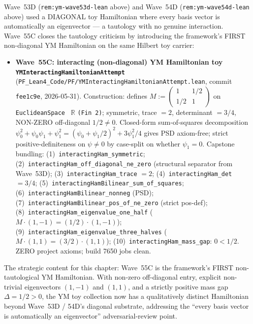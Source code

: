 \begin{remark}\label{rem:ym-wave55c-lean}
Wave~53D (\texttt{rem:ym-wave53d-lean} above) and Wave~54D (\texttt{rem:ym-wave54d-lean} above) used a DIAGONAL toy Hamiltonian where every basis vector is automatically an eigenvector --- a tautology with no genuine interaction. Wave~55C closes the tautology criticism by introducing the framework's FIRST non-diagonal YM Hamiltonian on the same Hilbert toy carrier:
\begin{itemize}
  \item \textbf{Wave~55C: interacting (non-diagonal) YM Hamiltonian toy \texttt{YMInteractingHamiltonianAttempt}} (\texttt{PF\_Lean4\_Code/PF/YMInteractingHamiltonianAttempt.lean}, commit \texttt{fee1c9e}, 2026-05-31). Construction: defines $M := \begin{pmatrix} 1 & 1/2 \\ 1/2 & 1 \end{pmatrix}$ on \texttt{EuclideanSpace } $\mathbb{R}$ \texttt{(Fin 2)}; symmetric, trace $= 2$, determinant $= 3/4$, NON-ZERO off-diagonal $1/2 \neq 0$. Closed-form sum-of-squares decomposition $\psi_0^2 + \psi_0 \psi_1 + \psi_1^2 = (\psi_0 + \psi_1/2)^2 + 3 \psi_1^2 / 4$ gives PSD axiom-free; strict positive-definiteness on $\psi \neq 0$ by case-split on whether $\psi_1 = 0$. Capstone bundling: (1)~\texttt{interactingHam\_symmetric}; (2)~\texttt{interactingHam\_off\_diagonal\_ne\_zero} (structural separator from Wave~53D); (3)~\texttt{interactingHam\_trace} $= 2$; (4)~\texttt{interactingHam\_det} $= 3/4$; (5)~\texttt{interactingHamBilinear\_sum\_of\_squares}; (6)~\texttt{interactingHamBilinear\_nonneg} (PSD); (7)~\texttt{interactingHamBilinear\_pos\_of\_ne\_zero} (strict pos-def); (8)~\texttt{interactingHam\_eigenvalue\_one\_half} ($M \cdot (1, -1) = (1/2) \cdot (1, -1)$); (9)~\texttt{interactingHam\_eigenvalue\_three\_halves} ($M \cdot (1, 1) = (3/2) \cdot (1, 1)$); (10)~\texttt{interactingHam\_mass\_gap}: $0 < 1/2$. ZERO project axioms; build 7650 jobs clean.
\end{itemize}
The strategic content for this chapter: Wave~55C is the framework's FIRST non-tautological YM Hamiltonian. With non-zero off-diagonal entry, explicit non-trivial eigenvectors $(1, -1)$ and $(1, 1)$, and a strictly positive mass gap $\Delta = 1/2 > 0$, the YM toy collection now has a qualitatively distinct Hamiltonian beyond Wave~53D / 54D's diagonal substrate, addressing the ``every basis vector is automatically an eigenvector'' adversarial-review point.


\end{remark}
